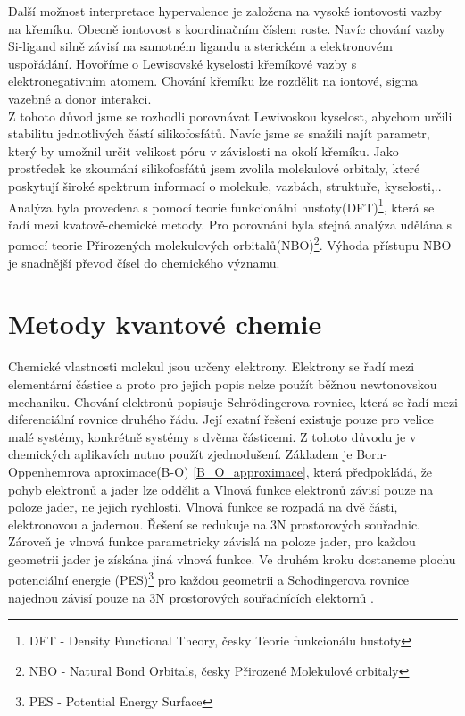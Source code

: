 \documentclass[
  digital, %
  table,   %
  lof,     %
  lot,     %
]{fithesis3}
\begin{document}
Další možnost interpretace hypervalence je založena na vysoké iontovosti vazby na křemíku. Obecně iontovost s koordinačním číslem roste.
Navíc chování vazby Si-ligand silně závisí na samotném ligandu a sterickém a elektronovém uspořádání. Hovoříme o Lewisovské kyselosti křemíkové vazby s elektronegativním atomem. Chování křemíku lze rozdělit na iontové, sigma vazebné a donor interakci.\cite{Wagler2014}\\

Z tohoto důvod jsme se rozhodli porovnávat Lewivoskou kyselost, abychom určili stabilitu jednotlivých částí silikofosfátů. Navíc jsme se snažili najít parametr, který by umožnil určit velikost póru v závislosti na okolí křemíku. Jako prostředek ke zkoumání silikofosfátů jsem zvolila molekulové orbitaly, které poskytují široké spektrum informací o molekule, vazbách, struktuře, kyselosti,..  Analýza byla provedena s pomocí teorie funkcionální hustoty(DFT)\footnote{DFT - Density Functional Theory, česky Teorie funkcionálu hustoty}, která se řadí mezi kvatově-chemické metody. Pro porovnání byla stejná analýza udělána s pomocí teorie Přirozených molekulových orbitalů(NBO)\footnote{NBO - Natural Bond Orbitals, česky Přirozené Molekulové orbitaly}. Výhoda přístupu NBO je snadnější převod čísel do chemického významu.


\section{Metody kvantové chemie}
Chemické vlastnosti molekul jsou určeny elektrony. Elektrony se řadí mezi elementární částice a proto pro jejich popis nelze použít běžnou newtonovskou mechaniku. Chování elektronů popisuje Schrödingerova rovnice, která se řadí mezi diferenciální rovnice druhého řádu. Její exatní řešení existuje pouze pro velice malé systémy, konkrétně systémy s dvěma částicemi. Z tohoto důvodu je v chemických aplikavích nutno použít zjednodušení. Základem je Born-Oppenhemrova aproximace(B-O) \ref{B_O_approximace}, která předpokládá, že pohyb elektronů a jader lze oddělit a Vlnová funkce elektronů závisí pouze na poloze jader, ne jejich rychlosti. Vlnová funkce se rozpadá na dvě části, elektronovou a jadernou. Řešení se redukuje na 3N prostorových souřadnic. Zároveň je vlnová funkce parametricky závislá na poloze jader, pro každou geometrii jader je získána jiná vlnová funkce. Ve druhém kroku dostaneme plochu potenciální energie (PES)\footnote{PES - Potential Energy Surface} pro každou geometrii a Schodingerova rovnice najednou závisí pouze na 3N prostorových souřadnících elektornů \cite{lechamolecularmodeling}.
\end{document}
